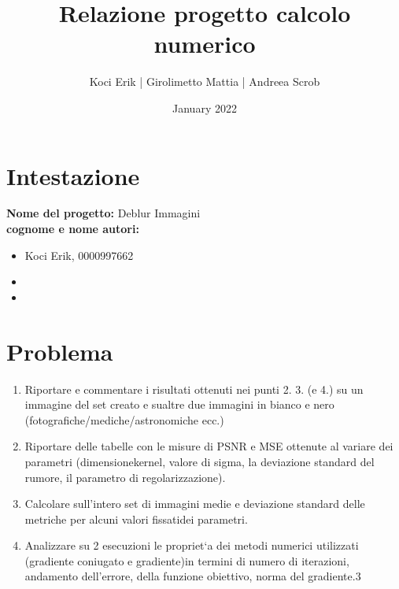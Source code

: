 \documentclass{article}
\title{Relazione progetto calcolo numerico}
\author{Koci Erik | Girolimetto Mattia | Andreea Scrob }
\date{January 2022}
\begin{document}
\maketitle

\section{Intestazione}
\textbf{Nome del progetto:} Deblur Immagini\\
\textbf{cognome e nome autori:}
\begin{itemize}
    \item Koci Erik, 0000997662
    \item
    \item
\end{itemize}

\section{Problema}
\begin{enumerate}
    \item Riportare e commentare i risultati ottenuti nei punti 2. 3. (e 4.) su un immagine del set creato e sualtre due immagini in bianco e nero (fotografiche/mediche/astronomiche ecc.)
    \item Riportare delle tabelle con le misure di PSNR e MSE ottenute al variare dei parametri (dimensionekernel, valore di sigma, la deviazione standard del rumore, il parametro di regolarizzazione).
    \item Calcolare sull’intero set di immagini medie e deviazione standard delle metriche per alcuni valori fissatidei parametri.
    \item Analizzare su 2 esecuzioni le propriet`a dei metodi numerici utilizzati (gradiente coniugato e gradiente)in termini di numero di iterazioni, andamento dell'errore, della funzione obiettivo, norma del gradiente.3
\end{enumerate}
\end{document}
